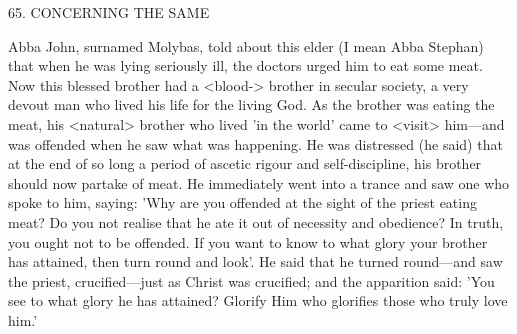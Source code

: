 65.
CONCERNING THE SAME

Abba John, surnamed Molybas, told about this elder (I mean Abba
Stephan) that when he was lying seriously ill, the doctors urged him
to eat some meat.
Now this blessed brother had a <blood-> brother
in secular society, a very devout man who lived his life for the living
God.
As the brother was eating the meat, his <natural> brother
who lived 'in the world' came to <visit> him—and was offended
when he saw what was happening.
He was distressed (he said) that
at the end of so long a period of ascetic rigour and self-discipline,
his brother should now partake of meat.
He immediately went into
a trance and saw one who spoke to him, saying: 'Why are you
offended at the sight of the priest eating meat? Do you not realise
that he ate it out of necessity and obedience? In truth, you ought
not to be offended.
If you want to know to what glory your brother
has attained, then turn round and look'.
He said that he turned
round—and saw the priest, crucified—just as Christ was crucified;
and the apparition said: 'You see to what glory he has attained?
Glorify Him who glorifies those who truly love him.'

